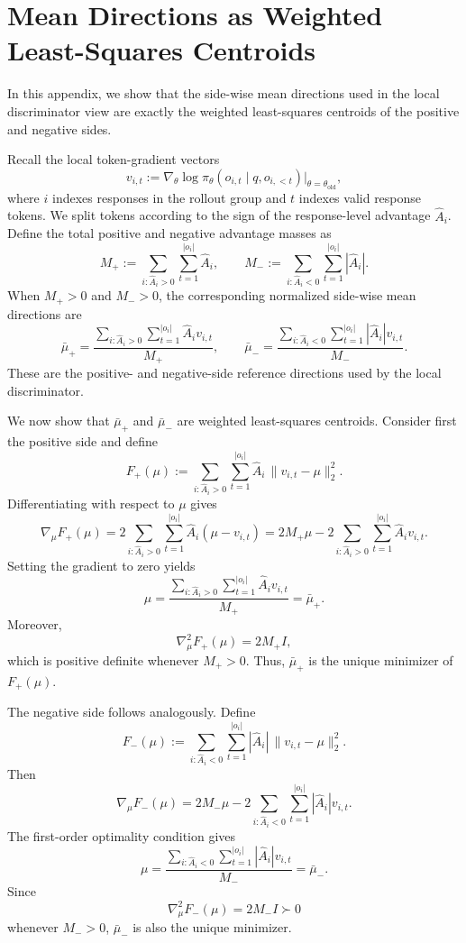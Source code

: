 \documentclass{article} %
\begin{document}
\section{Mean Directions as Weighted Least-Squares Centroids}
\label{app:l2-centroid}

In this appendix, we show that the side-wise mean directions used in the
local discriminator view are exactly the weighted least-squares centroids
of the positive and negative sides.

Recall the local token-gradient vectors
\[
v_{i,t}
:=
\nabla_\theta
\log \pi_\theta(o_{i,t}\mid q,o_{i,<t})
\Big|_{\theta=\theta_{\mathrm{old}}},
\]
where \(i\) indexes responses in the rollout group and \(t\) indexes valid
response tokens. We split tokens according to the sign of the response-level
advantage \(\hat A_i\). Define the total positive and negative advantage masses as
\[
M_+
:=
\sum_{i:\hat A_i>0}\sum_{t=1}^{|o_i|}
\hat A_i,
\qquad
M_-
:=
\sum_{i:\hat A_i<0}\sum_{t=1}^{|o_i|}
|\hat A_i|.
\]
When \(M_+>0\) and \(M_->0\), the corresponding normalized side-wise mean
directions are
\[
\bar\mu_+
=
\frac{
\sum_{i:\hat A_i>0}\sum_{t=1}^{|o_i|}
\hat A_i v_{i,t}
}{
M_+
},
\qquad
\bar\mu_-
=
\frac{
\sum_{i:\hat A_i<0}\sum_{t=1}^{|o_i|}
|\hat A_i| v_{i,t}
}{
M_-
}.
\]
These are the positive- and negative-side reference directions used by the
local discriminator.

We now show that \(\bar\mu_+\) and \(\bar\mu_-\) are weighted least-squares
centroids. Consider first the positive side and define
\[
F_+(\mu)
:=
\sum_{i:\hat A_i>0}\sum_{t=1}^{|o_i|}
\hat A_i\,\|v_{i,t}-\mu\|_2^2.
\]
Differentiating with respect to \(\mu\) gives
\[
\nabla_\mu F_+(\mu)
=
2\sum_{i:\hat A_i>0}\sum_{t=1}^{|o_i|}
\hat A_i(\mu-v_{i,t})
=
2M_+\mu
-
2\sum_{i:\hat A_i>0}\sum_{t=1}^{|o_i|}
\hat A_i v_{i,t}.
\]
Setting the gradient to zero yields
\[
\mu
=
\frac{
\sum_{i:\hat A_i>0}\sum_{t=1}^{|o_i|}
\hat A_i v_{i,t}
}{
M_+
}
=
\bar\mu_+.
\]
Moreover,
\[
\nabla_\mu^2 F_+(\mu)
=
2M_+ I,
\]
which is positive definite whenever \(M_+>0\). Thus, \(\bar\mu_+\) is the
unique minimizer of \(F_+(\mu)\).

The negative side follows analogously. Define
\[
F_-(\mu)
:=
\sum_{i:\hat A_i<0}\sum_{t=1}^{|o_i|}
|\hat A_i|\,\|v_{i,t}-\mu\|_2^2.
\]
Then
\[
\nabla_\mu F_-(\mu)
=
2M_-\mu
-
2\sum_{i:\hat A_i<0}\sum_{t=1}^{|o_i|}
|\hat A_i| v_{i,t}.
\]
The first-order optimality condition gives
\[
\mu
=
\frac{
\sum_{i:\hat A_i<0}\sum_{t=1}^{|o_i|}
|\hat A_i| v_{i,t}
}{
M_-
}
=
\bar\mu_-.
\]
Since
\[
\nabla_\mu^2 F_-(\mu)
=
2M_- I
\succ 0
\]
whenever \(M_->0\), \(\bar\mu_-\) is also the unique minimizer.
\end{document}
